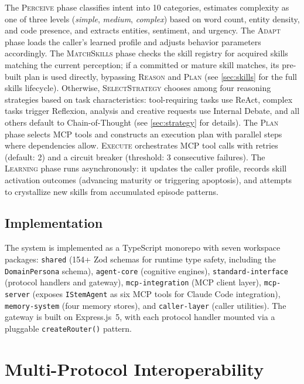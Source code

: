 \documentclass{article}
\begin{document}
The \textsc{Perceive} phase classifies intent into 10 categories, estimates complexity as one of three levels (\emph{simple}, \emph{medium}, \emph{complex}) based on word count, entity density, and code presence, and extracts entities, sentiment, and urgency. The \textsc{Adapt} phase loads the caller's learned profile and adjusts behavior parameters accordingly. The \textsc{MatchSkills} phase checks the skill registry for acquired skills matching the current perception; if a committed or mature skill matches, its pre-built plan is used directly, bypassing \textsc{Reason} and \textsc{Plan} (see \cref{sec:skills} for the full skills lifecycle). Otherwise, \textsc{SelectStrategy} chooses among four reasoning strategies based on task characteristics: tool-requiring tasks use ReAct, complex tasks trigger Reflexion, analysis and creative requests use Internal Debate, and all others default to Chain-of-Thought (see \cref{sec:strategy} for details). The \textsc{Plan} phase selects MCP tools and constructs an execution plan with parallel steps where dependencies allow. \textsc{Execute} orchestrates MCP tool calls with retries (default: 2) and a circuit breaker (threshold: 3 consecutive failures). The \textsc{Learning} phase runs asynchronously: it updates the caller profile, records skill activation outcomes (advancing maturity or triggering apoptosis), and attempts to crystallize new skills from accumulated episode patterns.

\subsection{Implementation}

The system is implemented as a TypeScript monorepo with seven workspace packages: \texttt{shared} (154+ Zod schemas for runtime type safety, including the \texttt{DomainPersona} schema), \texttt{agent-core} (cognitive engines), \texttt{standard-interface} (protocol handlers and gateway), \texttt{mcp-integration} (MCP client layer), \texttt{mcp-server} (exposes \texttt{IStemAgent} as six MCP tools for Claude Code integration), \texttt{memory-system} (four memory stores), and \texttt{caller-layer} (caller utilities). The gateway is built on Express.js~5, with each protocol handler mounted via a pluggable \texttt{createRouter()} pattern.

\section{Multi-Protocol Interoperability}
\label{sec:protocols}
\end{document}
